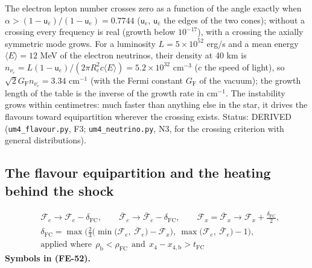 \documentclass[
  10pt,
]{article}
\begin{document}
The electron lepton number crosses zero as a function of the angle
exactly when
\(\alpha > (1 - \mathsf{u}_{\bar e})/(1 - \mathsf{u}_e) = 0.7744\)
(\(\mathsf{u}_e\), \(\mathsf{u}_{\bar e}\) the edges of the two cones);
without a crossing every frequency is real (growth below \(10^{-17}\)),
with a crossing the axially symmetric mode grows. For a luminosity
\(L = 5\times10^{52}\) erg/s and a mean energy \(\langle E\rangle = 12\)
MeV of the electron neutrinos, their density at 40 km is
\(n_{\nu_e} = L(1 - \mathsf{u}_e)/(2\pi R_e^2c\langle E\rangle) = 5.2\times10^{32}\)
cm\(^{-3}\) (\(c\) the speed of light), so
\(\sqrt2G_{\mathrm{F}}n_{\nu_e} = 3.34\) cm\(^{-1}\) (with the Fermi
constant \(G_{\mathrm{F}}\) of the vacuum); the growth length of the
table is the inverse of the growth rate in cm\(^{-1}\). The instability
grows within centimetres: much faster than anything else in the star, it
drives the flavours toward equipartition wherever the crossing exists.
Status: DERIVED (\texttt{um4\_flavour.py}, F3;
\texttt{um4\_neutrino.py}, N3, for the crossing criterion with general
distributions).

\hypertarget{the-flavour-equipartition-and-the-heating-behind-the-shock}{%
\subsection{The flavour equipartition and the heating behind the
shock}\label{the-flavour-equipartition-and-the-heating-behind-the-shock}}

\[
\begin{aligned}
&\mathcal{F}_{e} \to \mathcal{F}_{e} - \delta_{\mathrm{FC}},\qquad \bar{\mathcal{F}}_{e} \to \bar{\mathcal{F}}_{e} - \delta_{\mathrm{FC}},\qquad
 \mathcal{F}_{x} = \bar{\mathcal{F}}_{x} \to \mathcal{F}_{x} + \frac{\delta_{\mathrm{FC}}}{2},\\
&\delta_{\mathrm{FC}} = \max\Big(\frac23\Big(\min\big(\mathcal{F}_{e},\ \bar{\mathcal{F}}_{e}\big) - \mathcal{F}_{x}\Big),\ \max\big(\mathcal{F}_{e},\ \bar{\mathcal{F}}_{e}\big) - 1\Big),\\
&\text{applied where}\ \ \rho_{\mathrm{b}} < \rho_{\mathrm{FC}}\ \ \text{and}\ \ x_4 - x_{4,\mathrm{b}} > t_{\mathrm{FC}}
\end{aligned} \tag{FE-52}
\] \textbf{Symbols in (FE-52).}
\end{document}
